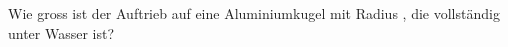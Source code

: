 Wie gross ist der Auftrieb auf eine Aluminiumkugel mit Radius \rKO, die vollständig unter Wasser ist?
